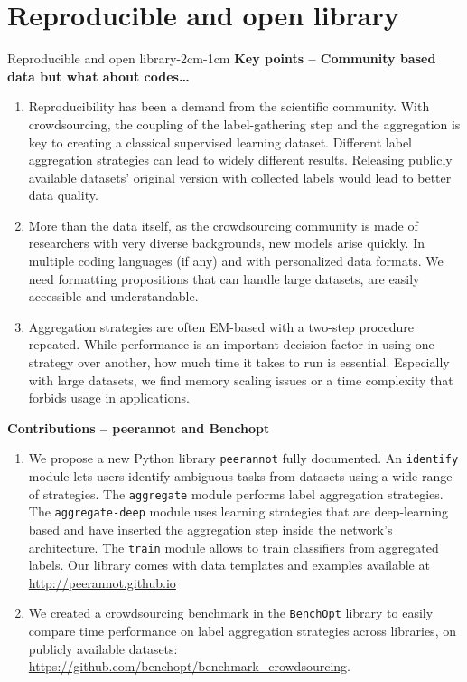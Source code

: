 \chapter{Reproducible and open library}
\label{chap:peerannot}
\enlargethispage{3\baselineskip}

\begin{keypointstwomargins}{Reproducible and open library}{-2cm}{-1cm}
        \textbf{Key points -- Community based data but what about codes\dots}
        \begin{enumerate}[leftmargin=*]
        \item Reproducibility has been a demand from the scientific community. With crowdsourcing, the coupling of the label-gathering step and the aggregation is key to creating a classical supervised learning dataset. Different label aggregation strategies can lead to widely different results. Releasing publicly available datasets' original version with collected labels would lead to better data quality.
        \item More than the data itself, as the crowdsourcing community is made of researchers with very diverse backgrounds, new models arise quickly. In multiple coding languages (if any) and with personalized data formats. We need formatting propositions that can handle large datasets, are easily accessible and understandable.
        \item Aggregation strategies are often EM-based with a two-step procedure repeated. While performance is an important decision factor in using one strategy over another, how much time it takes to run is essential. Especially with large datasets, we find memory scaling issues or a time complexity that forbids usage in applications.
        \end{enumerate}

        \textbf{Contributions -- peerannot and Benchopt}
        \begin{enumerate}[leftmargin=*,start=4]
        \item We propose a new Python library \texttt{peerannot} fully documented. An \texttt{identify} module lets users identify ambiguous tasks from datasets using a wide range of strategies. The \texttt{aggregate} module performs label aggregation strategies. The \texttt{aggregate-deep} module uses learning strategies that are deep-learning based and have inserted the aggregation step inside the network's architecture. The \texttt{train} module allows to train classifiers from aggregated labels. Our library comes with data templates and examples available at \url{http://peerannot.github.io}
        \item We created a crowdsourcing benchmark in the \texttt{BenchOpt} library to easily compare time performance on label aggregation strategies across libraries, on publicly available datasets: \url{https://github.com/benchopt/benchmark\_crowdsourcing}.
        \end{enumerate}
\end{keypointstwomargins}

